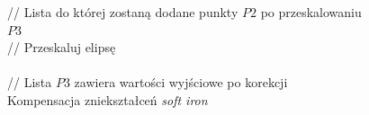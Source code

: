 \begin{algorithm}[H]
// Lista do której zostaną dodane punkty $P2$ po przeskalowaniu \\
$P3$ \\[10pt]

// Przeskaluj elipsę \\ 
\EndFor\\[10pt]

// Lista $P3$ zawiera wartości wyjściowe po korekcji \\ 
\caption{Kompensacja zniekształceń \emph{soft iron}}
\label{pcode:soft-iron-corr}
\end{algorithm}

